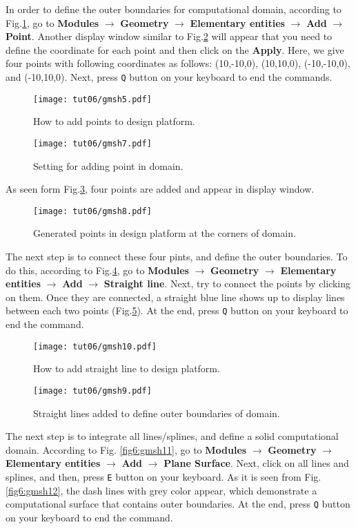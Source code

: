 In order to define the outer boundaries for computational domain, according to Fig.\ref{fig6:gmsh5}, go to \textbf{Modules} $\rightarrow$ \textbf{Geometry} $\rightarrow$ \textbf{Elementary entities} $\rightarrow$ \textbf{Add} $\rightarrow$ \textbf{Point}. Another display window similar to Fig.\ref{fig6:gmsh7} will appear that you need to define the coordinate for each point and then click on the \textbf{Apply}. Here, we give four points with following coordinates as follows: (10,-10,0), (10,10,0), (-10,-10,0), and (-10,10,0). Next, press \texttt{Q} button on your keyboard to end the commands.
\begin{figure}[htbp]
    \centering
    \texttt{[image: tut06/gmsh5.pdf]}
    \caption{How to add points to design platform.}
    \label{fig6:gmsh5}
\end{figure}
\begin{figure}[htbp]
    \centering
    \texttt{[image: tut06/gmsh7.pdf]}
    \caption{Setting for adding point in domain.}
    \label{fig6:gmsh7}
\end{figure}
As seen form Fig.\ref{fig6:gmsh8}, four points are added and appear in display window.
\begin{figure}[htbp]
    \centering
    \texttt{[image: tut06/gmsh8.pdf]}
    \caption{Generated points in design platform at the corners of domain.}
    \label{fig6:gmsh8}
\end{figure}
The next step is to connect these four pints, and define the outer boundaries. To do this, according to Fig.\ref{fig6:gmsh10}, go to \textbf{Modules} $\rightarrow$ \textbf{Geometry} $\rightarrow$ \textbf{Elementary entities} $\rightarrow$ \textbf{Add} $\rightarrow$ \textbf{Straight line}. Next, try to connect the points by clicking on them. Once they are connected, a straight blue line shows up to display lines between each two points (Fig.\ref{fig6:gmsh9}). At the end, press \texttt{Q} button on your keyboard to end the command.
\begin{figure}[htbp]
    \centering
    \texttt{[image: tut06/gmsh10.pdf]}
    \caption{How to add straight line to design platform.}
    \label{fig6:gmsh10}
\end{figure}
\begin{figure}[htbp]
    \centering
    \texttt{[image: tut06/gmsh9.pdf]}
    \caption{Straight lines added to define outer boundaries of domain.}
    \label{fig6:gmsh9}
\end{figure}
The next step is to integrate all lines/splines, and define a solid computational domain. According to Fig. \ref{fig6:gmsh11}, go to \textbf{Modules} $\rightarrow$ \textbf{Geometry} $\rightarrow$ \textbf{Elementary entities} $\rightarrow$ \textbf{Add} $\rightarrow$ \textbf{Plane Surface}. Next, click on all lines and splines, and then, press \texttt{E} button on your keyboard. As it is seen from Fig.\ref{fig6:gmsh12}, the dash lines with grey color appear, which demonstrate a computational surface that contains outer boundaries. At the end, press \texttt{Q} button on your keyboard to end the command.
